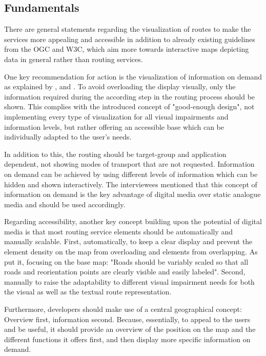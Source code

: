 \documentclass[agile, final]{copernicus-agile}
\begin{document}
\subsection{Fundamentals}

There are general statements regarding the visualization of routes to make the services more appealing and accessible in addition to already existing guidelines from the OGC and W3C, which aim more towards interactive maps depicting data in general rather than routing services. 

One key recommendation for action is the visualization of information on demand as explained by \citet{NeuschmidEA2012}, \citet{AgrawalaStolte2000} and \citet{Delikostidis2011}. To avoid overloading the display visually, only the information required during the according step in the routing process should be shown. This complies with the introduced concept of "good-enough design", not implementing every type of visualization for all visual impairments and information levels, but rather offering an accessible base which can be individually adapted to the user's needs.

In addition to this, the routing should be target-group and application dependent, not showing modes of transport that are not requested. Information on demand can be achieved by using different levels of information which can be hidden and shown interactively. The interviewees mentioned that this concept of information on demand is the key advantage of digital media over static analogue media and should be used accordingly.

Regarding accessibility, another key concept building upon the potential of digital media is that most routing service elements should be automatically and manually scalable. First, automatically, to keep a clear display and prevent the element density on the map from overloading and elements from overlapping. As \citet{AgrawalaStolte2000} put it, focusing on the base map: "Roads should be variably scaled so that all roads and reorientation points are clearly visible and easily labeled". Second, manually to raise the adaptability to different visual impairment needs for both the visual as well as the textual route representation. 

Furthermore, developers should make use of a central geographical concept: Overview first, information second. Because, essentially, to appeal to the users and be useful, it should provide an overview of the position on the map and the different functions it offers first, and then display more specific information on demand.
\end{document}
